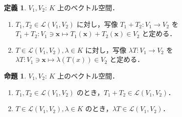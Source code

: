 \documentclass{jlreq}
\theoremstyle{definition}
\newtheorem{dfn}[thm]{定義}
\newtheorem{prop}[thm]{命題}
\begin{document}
      \begin{dfn}\label{linear-map-addition-and-scalar-multiplication}
        $V_1, V_2$: $K$ 上のベクトル空間．
        \begin{enumerate}
          \item $T_1,T_2\in\mathcal{L}(V_1,V_2)$ に対し，写像 $T_1+T_2 \colon V_1 \to V_2$ を $T_1+T_2 \colon V_1 \ni \bm{x} \mapsto T_1(\bm{x})+T_2(\bm{x}) \in V_2$ と定める．
          \item $T \in \mathcal{L}(V_1,V_2), \lambda \in K$ に対し，写像 $\lambda T \colon V_1 \to V_2$ を $\lambda T \colon V_1 \ni \bm{x} \mapsto \lambda(T(x)) \in V_2$ と定める．
        \end{enumerate}
      \end{dfn}
      \begin{prop}
        $V_1, V_2$: $K$ 上のベクトル空間．
        \begin{enumerate}
          \item $T_1,T_2 \in \mathcal{L}(V_1,V_2)$ のとき，$T_1+T_2 \in \mathcal{L}(V_1,V_2)$．
          \item $T\in\mathcal{L}(V_1,V_2), \lambda\in K$ のとき，$\lambda T \in \mathcal{L}(V_1,V_2)$．
        \end{enumerate}
      \end{prop}
\end{document}
